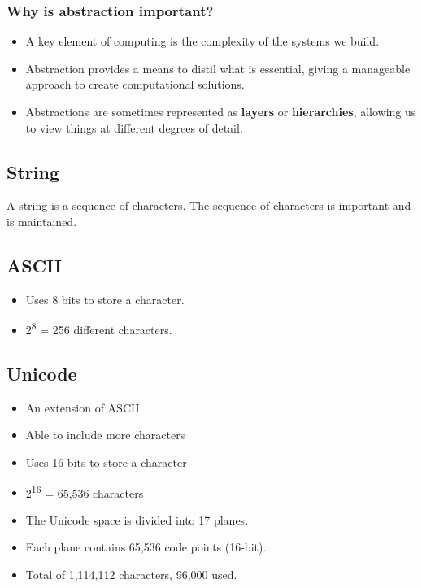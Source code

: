 \documentclass[11pt]{article}
\begin{document}
\subsubsection{Why is abstraction important?}
\label{sec:org88e1df7}
\begin{itemize}
\item A key element of computing is the complexity of the systems we build.
\item Abstraction provides a means to distil what is essential, giving a manageable approach to create computational solutions.
\item Abstractions are sometimes represented as \textbf{layers} or \textbf{hierarchies}, allowing us to view things at different degrees of detail.
\end{itemize}

\subsection{String}
\label{sec:org306fb60}
A string is a sequence of characters. The sequence of characters is important and is maintained.

\subsection{ASCII}
\label{sec:org41e0f23}
\begin{itemize}
\item Uses 8 bits to store a character.
\item 2\textsuperscript{8} = 256 different characters.
\end{itemize}

\subsection{Unicode}
\label{sec:org9deb43d}
\begin{itemize}
\item An extension of ASCII
\item Able to include more characters
\item Uses 16 bits to store a character
\item 2\textsuperscript{16} = 65,536 characters
\item The Unicode space is divided into 17 planes.
\item Each plane contains 65,536 code points (16-bit).
\item Total of 1,114,112 characters, 96,000 used.
\end{itemize}
\end{document}

